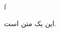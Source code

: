 \documentclass{report}
\begin{document}
\besmc
{}
\begin{center}
f
\end{center}
\clearpage
{}
این یک متن است. 
\end{document}
